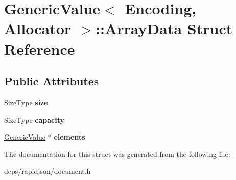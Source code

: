 \hypertarget{struct_generic_value_1_1_array_data}{}\section{Generic\+Value$<$ Encoding, Allocator $>$\+:\+:Array\+Data Struct Reference}
\label{struct_generic_value_1_1_array_data}
\subsection*{Public Attributes}
\begin{DoxyCompactItemize}
\item 
Size\+Type {\bfseries size}\hypertarget{struct_generic_value_1_1_array_data_a5306856f64aea8ec53abf263ed2a35e2}{}\label{struct_generic_value_1_1_array_data_a5306856f64aea8ec53abf263ed2a35e2}

\item 
Size\+Type {\bfseries capacity}\hypertarget{struct_generic_value_1_1_array_data_a0c6fe03c00e13d14b95abd31048aa1f5}{}\label{struct_generic_value_1_1_array_data_a0c6fe03c00e13d14b95abd31048aa1f5}

\item 
\hyperlink{class_generic_value}{Generic\+Value} $\ast$ {\bfseries elements}\hypertarget{struct_generic_value_1_1_array_data_afb45e99b11fd55f1e02a3a38d2d48167}{}\label{struct_generic_value_1_1_array_data_afb45e99b11fd55f1e02a3a38d2d48167}

\end{DoxyCompactItemize}


The documentation for this struct was generated from the following file\+:\begin{DoxyCompactItemize}
\item 
deps/rapidjson/document.\+h\end{DoxyCompactItemize}
